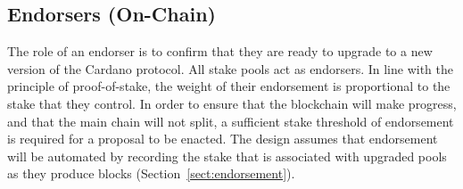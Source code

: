 \subsection{Endorsers (On-Chain)}

The role of an endorser is to confirm that they are ready to upgrade to a new
version of the Cardano protocol.  All stake pools act as endorsers.  In line with
the principle of proof-of-stake, the weight of their endorsement is proportional
to the stake that they control.  In order to ensure that the blockchain will
make progress, and that the main chain will not split, a sufficient stake
threshold of endorsement is required for a proposal to be enacted.
The design assumes that endorsement will be automated by recording the stake that
is associated with upgraded pools as they produce blocks (Section~\ref{sect:endorsement}).



